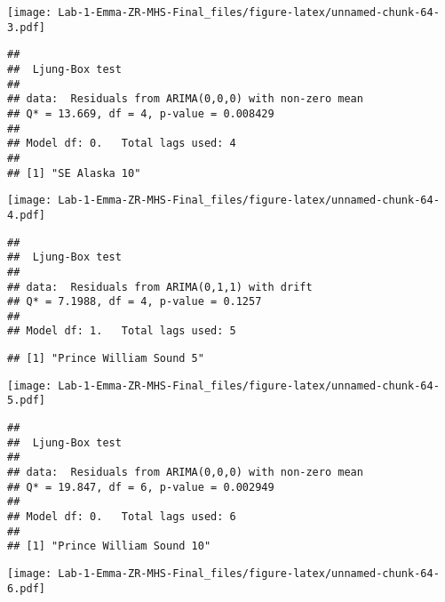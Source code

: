 \documentclass[
]{article}
\newenvironment{Shaded}{\begin{snugshade}}{\end{snugshade}}
\newcommand{\CommentTok}[1]{\textcolor[rgb]{0.56,0.35,0.01}{\textit{#1}}}
\newcommand{\ControlFlowTok}[1]{\textcolor[rgb]{0.13,0.29,0.53}{\textbf{#1}}}
\newcommand{\DecValTok}[1]{\textcolor[rgb]{0.00,0.00,0.81}{#1}}
\newcommand{\FunctionTok}[1]{\textcolor[rgb]{0.00,0.00,0.00}{#1}}
\newcommand{\NormalTok}[1]{#1}
\newcommand{\OtherTok}[1]{\textcolor[rgb]{0.56,0.35,0.01}{#1}}
\newcommand{\SpecialCharTok}[1]{\textcolor[rgb]{0.00,0.00,0.00}{#1}}
\begin{document}
\texttt{[image: Lab-1-Emma-ZR-MHS-Final\_files/figure-latex/unnamed-chunk-64-3.pdf]}

\begin{verbatim}
## 
##  Ljung-Box test
## 
## data:  Residuals from ARIMA(0,0,0) with non-zero mean
## Q* = 13.669, df = 4, p-value = 0.008429
## 
## Model df: 0.   Total lags used: 4
## 
## [1] "SE Alaska 10"
\end{verbatim}

\texttt{[image: Lab-1-Emma-ZR-MHS-Final\_files/figure-latex/unnamed-chunk-64-4.pdf]}

\begin{verbatim}
## 
##  Ljung-Box test
## 
## data:  Residuals from ARIMA(0,1,1) with drift
## Q* = 7.1988, df = 4, p-value = 0.1257
## 
## Model df: 1.   Total lags used: 5
\end{verbatim}

\begin{Shaded}
\end{Shaded}

\begin{verbatim}
## [1] "Prince William Sound 5"
\end{verbatim}

\texttt{[image: Lab-1-Emma-ZR-MHS-Final\_files/figure-latex/unnamed-chunk-64-5.pdf]}

\begin{verbatim}
## 
##  Ljung-Box test
## 
## data:  Residuals from ARIMA(0,0,0) with non-zero mean
## Q* = 19.847, df = 6, p-value = 0.002949
## 
## Model df: 0.   Total lags used: 6
## 
## [1] "Prince William Sound 10"
\end{verbatim}

\texttt{[image: Lab-1-Emma-ZR-MHS-Final\_files/figure-latex/unnamed-chunk-64-6.pdf]}
\end{document}
